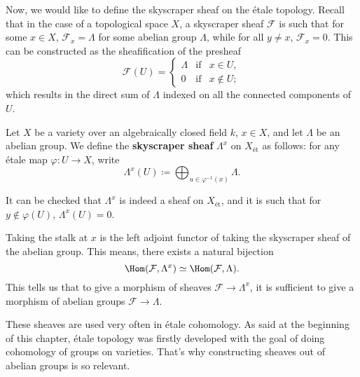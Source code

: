 
Now, we would like to define the skyscraper sheaf on the \'{e}tale topology. Recall that in the case of a topological space $X$, a skyscraper sheaf $\mathcal{F}$ is such that for some $x\in X$, $\mathcal{F}_x=\Lambda$ for some abelian group $\Lambda$, while for all $y\neq x$, $\mathcal{F}_x=0$. This can be constructed as the sheafification of the presheaf
\[\mathcal{F}(U)=\left\{\begin{array}{rcl}\Lambda&\text{if}&x\in U,\\0&\text{if}&x\notin U;\end{array}\right.\]
which results in the direct sum of $\Lambda$ indexed on all the connected components of $U$.

\begin{definition}
Let $X$ be a variety over an algebraically closed field $k$, $x\in X$, and let $\Lambda$ be an abelian group. We define the \textbf{skyscraper sheaf} $\Lambda^x$ on $X_{\text{\'{e}t}}$ as follows: for any \'{e}tale map $\varphi:U\rightarrow X$, write
\[\Lambda^x(U)\coloneqq\bigoplus_{u\in\varphi^{-1}(x)}\Lambda.\]
\end{definition}

It can be checked that $\Lambda^x$ is indeed a sheaf on $X_{\text{\'{e}t}}$, and it is such that for $y\notin\varphi(U)$, $\Lambda^x(U)=0$.

\begin{remark}
Taking the stalk at $x$ is the left adjoint functor of taking the skyscraper sheaf of the abelian group. This means, there exists a natural bijection
\[\Hom(\mathcal{F},\Lambda^x)\simeq\Hom(\mathcal{F},\Lambda).\]
This tells us that to give a morphism of sheaves $\mathcal{F}\rightarrow\Lambda^x$, it is sufficient to give a morphism of abelian groups $\mathcal{F}\rightarrow\Lambda$.
\end{remark}

These sheaves are used very often in \'{e}tale cohomology. As said at the beginning of this chapter, \'{e}tale topology was firstly developed with the goal of doing cohomology of groups on varieties. That's why constructing sheaves out of abelian groups is so relevant.
